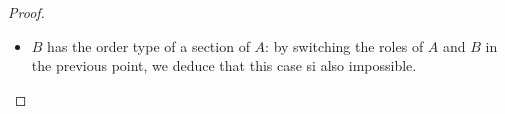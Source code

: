 \documentclass[11pt,a4paper,twoside]{article}
\theoremstyle{definition}
\begin{document}
\begin{proof}
\begin{enumerate}[(a)]
\begin{itemize}
\begin{itemize}
          \item $B$ has the order type of a section of $A$: by switching the roles of $A$ and $B$ in the previous point, we deduce
            that this case si also impossible.

        \end{itemize}

      \end{itemize}

  \end{enumerate}

\end{proof}
\end{document}
